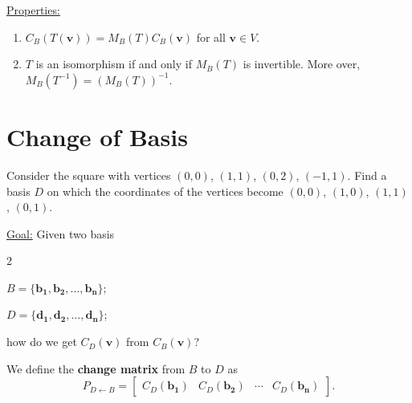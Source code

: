 \documentclass[20pt,a4paper]{extarticle}
\newcounter{example}
\newcounter{definition}
\begin{document}
\underline{Properties:}
	\begin{enumerate}[label=\Circled{\arabic*}]
		\item $C_B (T (\mathbf{v})) = M_B (T) C_B (\mathbf{v})$ for all $\mathbf{v} \in V$. 
		\item $T$ is an isomorphism if and only if $M_B (T)$ is invertible. More over, $M_B (T^{-1}) = (M_B (T))^{-1}$.
	\end{enumerate}

\newpage 

\section{Change of Basis}

\begin{example}
Consider the square with vertices $(0, 0)$, $(1, 1)$, $(0, 2)$, $(-1, 1)$. Find a basis $D$ on which the coordinates of the vertices become $(0, 0)$, $(1, 0)$, $(1, 1)$, $(0, 1)$.
\end{example}

\begin{solution}

\end{solution}

\vfill 

\underline{Goal:} Given two basis 
	\begin{itemize}
	\end{itemize}
\vspace*{-10pt}
how do we get $C_D (\mathbf{v})$ from $C_B (\mathbf{v})$?

\newpage 

\setcounter{example}{0}

\begin{example}[Continued]

\end{example}

\vfill 

\begin{definition}
We define the \textbf{change matrix} from $B$ to $D$ as
	\[
		P_{D \leftarrow B} = \begin{bmatrix} C_D (\mathbf{b_1}) & C_D (\mathbf{b_2}) & \cdots & C_D (\mathbf{b_n}) \end{bmatrix} .
	\]
\end{definition}
\end{document}
